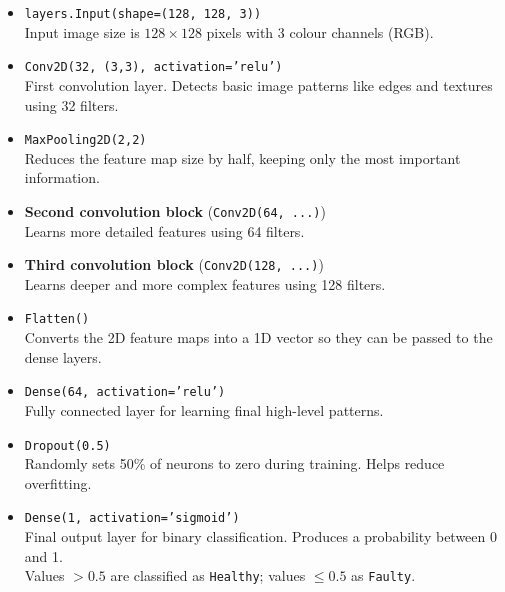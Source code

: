 \documentclass[12pt]{article}
\begin{document}
\begin{itemize}
    \item \texttt{layers.Input(shape=(128, 128, 3))} \\
          Input image size is $128 \times 128$ pixels with 3 colour channels (RGB).

    \item \texttt{Conv2D(32, (3,3), activation='relu')} \\
          First convolution layer. Detects basic image patterns like edges and textures using 32 filters.

    \item \texttt{MaxPooling2D(2,2)} \\
          Reduces the feature map size by half, keeping only the most important information.

    \item \textbf{Second convolution block} (\texttt{Conv2D(64, ...)}) \\
          Learns more detailed features using 64 filters.

    \item \textbf{Third convolution block} (\texttt{Conv2D(128, ...)}) \\
          Learns deeper and more complex features using 128 filters.

    \item \texttt{Flatten()} \\
          Converts the 2D feature maps into a 1D vector so they can be passed to the dense layers.

    \item \texttt{Dense(64, activation='relu')} \\
          Fully connected layer for learning final high-level patterns.

    \item \texttt{Dropout(0.5)} \\
          Randomly sets 50\% of neurons to zero during training. Helps reduce overfitting.

    \item \texttt{Dense(1, activation='sigmoid')} \\
          Final output layer for binary classification. Produces a probability between 0 and 1. \\
          Values $> 0.5$ are classified as \texttt{Healthy}; values $\leq 0.5$ as \texttt{Faulty}.
\end{itemize}
\end{document}
